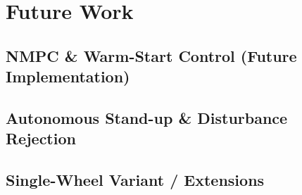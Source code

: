 \section{Future Work}

\subsection{NMPC \& Warm-Start Control (Future Implementation)}

\subsection{Autonomous Stand-up \& Disturbance Rejection}

\subsection{Single-Wheel Variant / Extensions}

